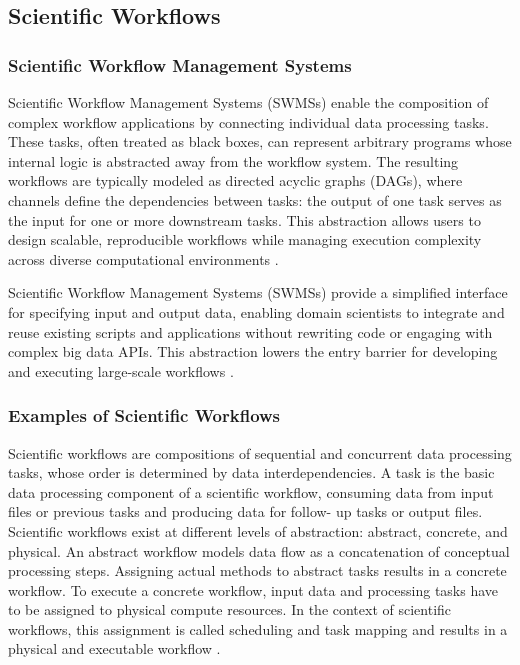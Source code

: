 \subsection{Scientific Workflows}
\label{sec:background_workflows}

\subsubsection{Scientific Workflow Management Systems}
\label{sec:background_workflows_swms}
Scientific Workflow Management Systems (SWMSs) enable the composition of complex workflow applications by connecting individual data processing tasks. These tasks, often treated as black boxes, can represent arbitrary programs whose internal logic is abstracted away from the workflow system. The resulting workflows are typically modeled as directed acyclic graphs (DAGs), where channels define the dependencies between tasks: the output of one task serves as the input for one or more downstream tasks. This abstraction allows users to design scalable, reproducible workflows while managing execution complexity across diverse computational environments \cite{thamsen2025energyawareworkflowexecutionoverview}.

Scientific Workflow Management Systems (SWMSs) provide a simplified interface for specifying input and output data, enabling domain scientists to integrate and reuse existing scripts and applications without rewriting code or engaging with complex big data APIs. This abstraction lowers the entry barrier for developing and executing large-scale workflows \cite{Bader_2022}.


\subsubsection{Examples of Scientific Workflows}
\label{sec:background_workflows_examples}
Scientific workflows are compositions of sequential and concurrent data processing tasks, whose order is determined by data interdependencies. A task is the basic data processing component of a scientific workflow, consuming data from input files or previous tasks and producing data for follow- up tasks or output files. Scientific workflows exist at different levels of abstraction: abstract, concrete, and physical. An abstract workflow models data flow as a concatenation of conceptual processing steps. Assigning actual methods to abstract tasks results in a concrete workflow. To execute a concrete workflow, input data and processing tasks have to be assigned to physical compute resources. In the context of scientific workflows, this assignment is called scheduling and task mapping and results in a physical and executable workflow \cite{Bux2013}.

